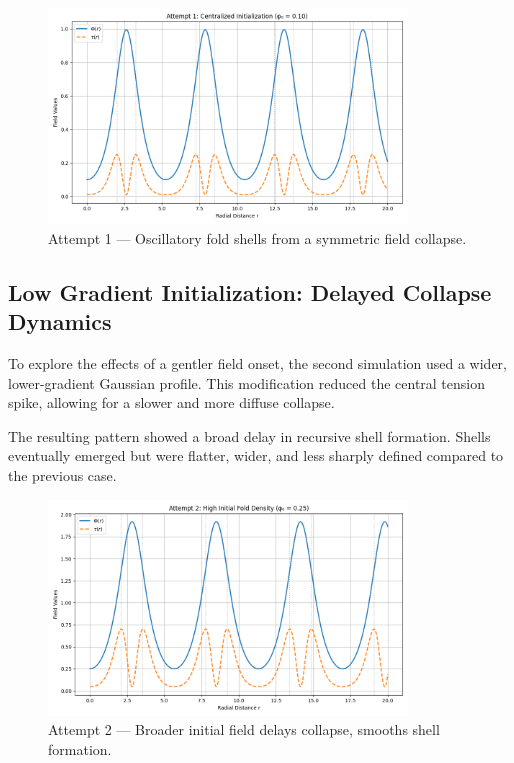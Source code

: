 \documentclass[12pt]{article}
\begin{document}
\vspace{1em}
\begin{figure}[H]
  \centering
  \includegraphics[width=0.85\textwidth]{attempt_1_sim.png}
  \caption{Attempt 1 — Oscillatory fold shells from a symmetric field collapse.}
\end{figure}


\subsection{Low Gradient Initialization: Delayed Collapse Dynamics}

To explore the effects of a gentler field onset, the second simulation used a wider, lower-gradient Gaussian profile. This modification reduced the central tension spike, allowing for a slower and more diffuse collapse.

The resulting pattern showed a broad delay in recursive shell formation. Shells eventually emerged but were flatter, wider, and less sharply defined compared to the previous case.

\vspace{1em}
\begin{figure}[H]
  \centering
  \includegraphics[width=0.85\textwidth]{attempt_2_sim.png}
  \caption{Attempt 2 — Broader initial field delays collapse, smooths shell formation.}
\end{figure}
\end{document}
